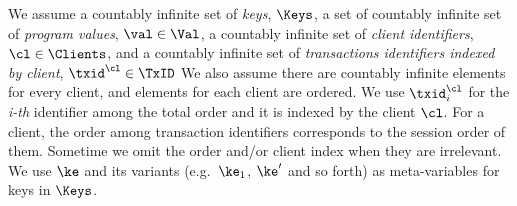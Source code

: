 We assume a countably infinite set of \emph{keys}, $\Keys $,
a set of countably infinite set of \emph{program values}, \( \val \in \Val \),
a countably infinite set of \emph{client identifiers}, \( \cl \in \Clients \),
and a countably infinite set of \emph{transactions identifiers indexed by client}, $\txid^{\cl} \in \TxID$
We also assume there are countably infinite elements for every client, and elements for each client are ordered.
We use \( \txid^{\cl}_{i}\) for the \emph{i-th} identifier among the total order and it is indexed by the client \( \cl \). 
For a client, the order among transaction identifiers corresponds to the session order of them.
Sometime we omit the order and/or client index when they are irrelevant.
We use $\ke$ and its variants (e.g.\ $\ke_1$, $\ke'$ and so forth) as meta-variables for keys in $\Keys$.
